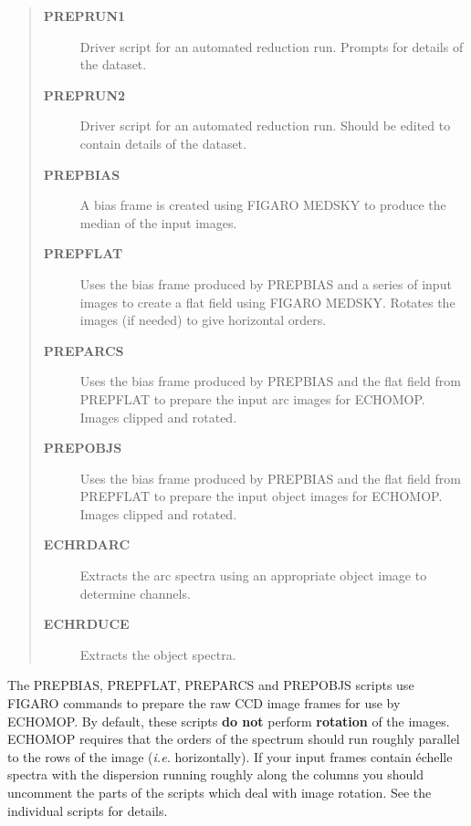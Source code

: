 \documentclass[twoside,11pt]{article}
\newcommand{\htmlref}[2]{#1}
\newcommand{\xref}[3]{#1}
\renewcommand{\_}{\texttt{\symbol{95}}}
\begin{document}
\begin{quote}
\begin{description}

\item [\htmlref{{\bf PREPRUN1}}{se_preprun}]
      Driver script for an automated reduction run.
      Prompts for details of the dataset.

\item [\htmlref{{\bf PREPRUN2}}{se_preprun}]
      Driver script for an automated reduction run.
      Should be edited to contain details of the dataset.

\item [\htmlref{{\bf PREPBIAS}}{se_prepbias}]
      A bias frame is created using \xref{FIGARO}{sun86}{}
      \xref{MEDSKY}{sun86}{MEDSKY} to produce the median of the input
      images.

\item [\htmlref{{\bf PREPFLAT}}{se_prepflat}]
      Uses the bias frame produced by PREPBIAS and a series
      of input images to create a flat field using FIGARO MEDSKY.
      Rotates the images (if needed) to give horizontal orders.

\item [\htmlref{{\bf PREPARCS}}{se_preparcs}]
      Uses the bias frame produced by PREPBIAS and the flat field
      from PREPFLAT to prepare the input arc images for ECHOMOP\@.
      Images clipped and rotated.

\item [\htmlref{{\bf PREPOBJS}}{se_prepobjs}]
      Uses the bias frame produced by PREPBIAS and the flat field
      from PREPFLAT to prepare the input object images for ECHOMOP\@.
      Images clipped and rotated.

\item [\htmlref{{\bf ECHRDARC}}{se_echrdarc}]
      Extracts the arc spectra using an appropriate object
      image to determine channels.

\item [\htmlref{{\bf ECHRDUCE}}{se_echrduce}]
      Extracts the object spectra.

\end{description}
\end{quote}

The PREPBIAS, PREPFLAT, PREPARCS and PREPOBJS scripts use FIGARO commands to
prepare the raw CCD image frames for use by ECHOMOP\@.
By default, these scripts {\bf do not} perform {\bf rotation} of the images.
ECHOMOP requires that the orders of the spectrum should run roughly parallel
to the rows of the image ({\it{i.e.}} horizontally).
If your input frames contain \'{e}chelle spectra with the dispersion running
roughly along the columns you should uncomment the parts of the scripts which
deal with image rotation.
See the individual scripts for details.
\end{document}
